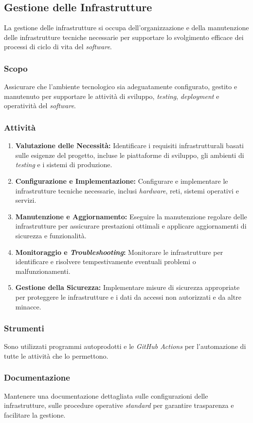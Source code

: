 \subsection{Gestione delle Infrastrutture}

La gestione delle infrastrutture si occupa dell'organizzazione e della
manutenzione delle infrastrutture tecniche necessarie per supportare lo
svolgimento efficace dei processi di ciclo di vita del \textit{software}.

\subsubsection{Scopo}
Assicurare che l'ambiente tecnologico sia adeguatamente configurato, gestito e
manutenuto per supportare le attività di sviluppo, \textit{testing},
\textit{deployment} e operatività del \textit{software}.

\subsubsection{Attività}
\begin{enumerate}
	\item \textbf{Valutazione delle Necessità:} Identificare i requisiti
	      infrastrutturali basati sulle esigenze del progetto, incluse le
	      piattaforme di sviluppo, gli ambienti di \textit{testing} e i sistemi
	      di produzione.
	\item \textbf{Configurazione e Implementazione:} Configurare e implementare
	      le infrastrutture tecniche necessarie, inclusi \textit{hardware},
	      reti, sistemi operativi e servizi.
	\item \textbf{Manutenzione e Aggiornamento:} Eseguire la manutenzione
	      regolare delle infrastrutture per assicurare prestazioni ottimali e
	      applicare aggiornamenti di sicurezza e funzionalità.
	\item \textbf{Monitoraggio e \textit{Troubleshooting}:} Monitorare le
	      infrastrutture per identificare e risolvere tempestivamente eventuali
	      problemi o malfunzionamenti.
	\item \textbf{Gestione della Sicurezza:} Implementare misure di sicurezza
	      appropriate per proteggere le infrastrutture e i dati da accessi non
	      autorizzati e da altre minacce.
\end{enumerate}

\subsubsection{Strumenti}
Sono utilizzati programmi autoprodotti e le \textit{GitHub Actions} per
l'automazione di tutte le attività che lo permettono.

\subsubsection{Documentazione}
Mantenere una documentazione dettagliata sulle configurazioni delle
infrastrutture, sulle procedure operative \textit{standard} per garantire trasparenza e
facilitare la gestione.
